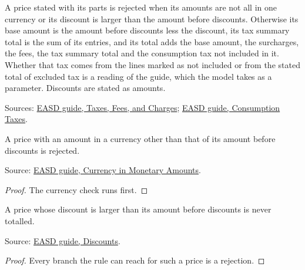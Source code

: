 \begin{definition}
  \label{def:offers-price-parts}
  A price stated with its parts is rejected when its amounts are not all in
  one currency or its discount is larger than the amount before discounts.
  Otherwise its base amount is the amount before discounts less the
  discount, its tax summary total is the sum of its entries, and its total
  adds the base amount, the surcharges, the fees, the tax summary total and
  the consumption tax not included in it. Whether that tax comes from the
  lines marked as not included or from the stated total of excluded tax is
  a reading of the guide, which the model takes as a parameter. Discounts
  are stated as amounts.

  Sources: \href{https://standards.atlassian.net/wiki/spaces/EASD/pages/574455915/Taxes+Fees+and+Charges}{EASD guide, Taxes, Fees, and Charges};
  \href{https://standards.atlassian.net/wiki/spaces/EASD/pages/2588377182/Consumption+Taxes}{EASD guide, Consumption Taxes}.
\end{definition}

\begin{theorem}
  \label{thm:offers-price-mixed-currency}
  A price with an amount in a currency other than that of its amount before
  discounts is rejected.

  Source: \href{https://standards.atlassian.net/wiki/spaces/EASD/pages/749305864/Currency+in+Monetary+Amounts}{EASD guide, Currency in Monetary Amounts}.
\end{theorem}
\begin{proof}
  The currency check runs first.
\end{proof}

\begin{theorem}
  \label{thm:offers-price-large-discount}
  A price whose discount is larger than its amount before discounts is never
  totalled.

  Source: \href{https://standards.atlassian.net/wiki/spaces/EASD/pages/574849038/Discounts}{EASD guide, Discounts}.
\end{theorem}
\begin{proof}
  Every branch the rule can reach for such a price is a rejection.
\end{proof}

